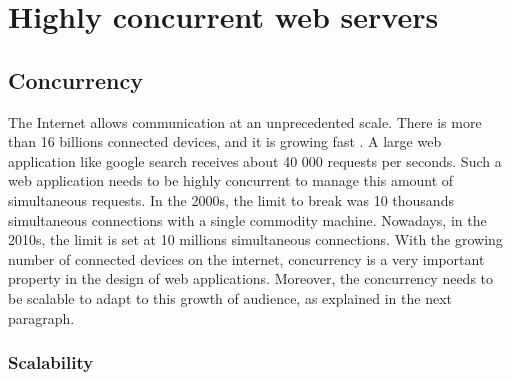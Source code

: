 \section{Highly concurrent web servers} \label{chapter2:highly-concurrent-web-servers}



\subsection{Concurrency}

The Internet allows communication at an unprecedented scale.
There is more than 16 billions connected devices, and it is growing fast \cite{Hilbert2011}.
A large web application like google search receives about 40 000 requests per seconds.
Such a web application needs to be highly concurrent to manage this amount of simultaneous requests.
In the 2000s, the limit to break was 10 thousands simultaneous connections with a single commodity machine.
Nowadays, in the 2010s, the limit is set at 10 millions simultaneous connections.
With the growing number of connected devices on the internet, concurrency is a very important property in the design of web applications.
Moreover, the concurrency needs to be scalable to adapt to this growth of audience, as explained in the next paragraph.

\subsubsection{Scalability}

